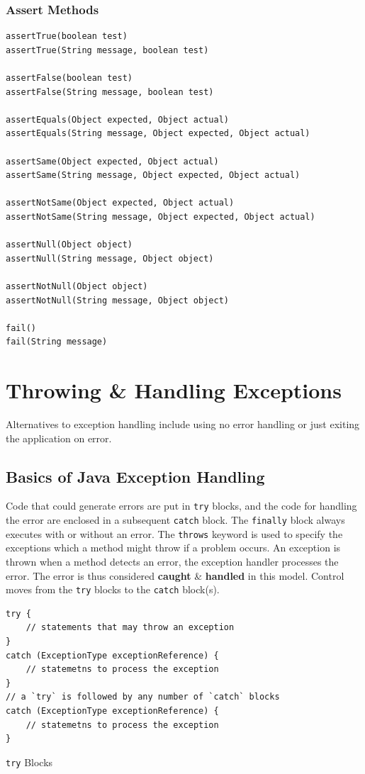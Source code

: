 \documentclass[a4paper,11pt]{article}
\newenvironment{code}{\captionsetup{type=listing}}{}
\begin{document}
\subsubsection{Assert Methods}
\begin{code}
\begin{verbatim}
assertTrue(boolean test)
assertTrue(String message, boolean test)

assertFalse(boolean test)
assertFalse(String message, boolean test)

assertEquals(Object expected, Object actual)
assertEquals(String message, Object expected, Object actual)

assertSame(Object expected, Object actual)
assertSame(String message, Object expected, Object actual) 

assertNotSame(Object expected, Object actual)
assertNotSame(String message, Object expected, Object actual) 

assertNull(Object object)
assertNull(String message, Object object) 

assertNotNull(Object object)
assertNotNull(String message, Object object) 

fail()
fail(String message) 
\end{verbatim}
\end{code}

\section{Throwing \& Handling Exceptions}
Alternatives to exception handling include using no error handling or just exiting the application on error.

\subsection{Basics of Java Exception Handling}
Code that could generate errors are put in \verb|try| blocks, and the code for handling the error are enclosed in a 
subsequent \verb|catch| block.
The \verb|finally| block always executes with or without an error.
The \verb|throws| keyword is used to specify the exceptions which a method might throw if a problem occurs.
An exception is thrown when a method detects an error, the exception handler processes the error. 
The error is thus considered \textbf{caught} \& \textbf{handled} in this model.
Control moves from the \verb|try| blocks to the \verb|catch| block(s).

\begin{code}
\begin{verbatim}
try {
    // statements that may throw an exception
}
catch (ExceptionType exceptionReference) {
    // statemetns to process the exception
}
// a `try` is followed by any number of `catch` blocks 
catch (ExceptionType exceptionReference) {
    // statemetns to process the exception
}
\end{verbatim}
\caption{\texttt{try} Blocks}
\end{code}
\end{document}
